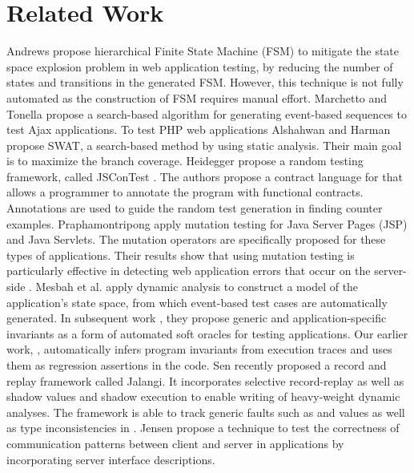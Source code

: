 \section{Related Work} \label{Sec:related}

Andrews \etal \cite{andrews:fms} propose hierarchical Finite State Machine (FSM) to mitigate the state space explosion problem in web application testing, by reducing the number of states and transitions in the generated FSM. However, this technique is not fully automated as the construction of FSM requires manual effort.
Marchetto and Tonella \cite{marchetto:search} propose a search-based algorithm for generating event-based sequences to test Ajax applications. 
To test PHP web applications Alshahwan and Harman \cite{alshahwan:ase11} propose SWAT, a search-based method by using static analysis. Their main goal is to maximize the branch coverage.
Heidegger \etal propose a random testing framework, called JSConTest \cite{heidegger:tools10}. The authors propose a contract language for \javascript that allows a programmer to annotate the program with functional contracts. Annotations are used to guide the random test generation in finding counter examples.
Praphamontripong \etal \cite{praphamontripong:icstw10} apply mutation testing for Java Server Pages (JSP) and Java Servlets. The mutation operators are specifically proposed for these types of applications. Their results show that using mutation testing is particularly effective in detecting web application errors that occur on the server-side
.
Mesbah et al.  \cite{mesbah:tweb11} apply dynamic analysis to construct a model of the application's state space, from which event-based test cases are automatically generated. In subsequent work \cite{mesbah:tse12}, they propose generic and application-specific invariants as a form of automated soft oracles for testing \ajax applications.  Our earlier work, \jsart \cite{mirshokraie:icwe12}, automatically infers program invariants from \javascript execution traces and uses them as regression assertions in the code. 
Sen \etal \cite{sen:fse13} recently proposed a record and replay framework called Jalangi. It incorporates selective record-replay as well as shadow values and shadow execution to enable writing of heavy-weight dynamic analyses.
The framework is able to track generic faults such as  and  values as well as type inconsistencies in \javascript. 
Jensen \etal \cite{jensen:fse13} propose a technique to test the correctness of communication patterns between client and server in \ajax applications by incorporating server interface descriptions.
